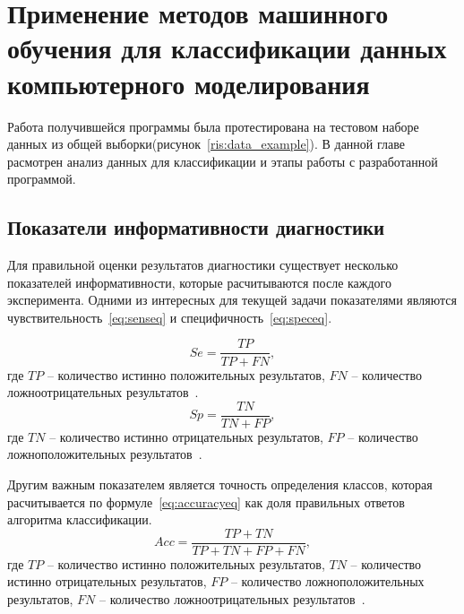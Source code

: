 \newpage
\section{\Large Применение методов машинного обучения для классификации данных компьютерного моделирования}
Работа получившейся программы была протестирована на тестовом наборе данных из общей выборки(рисунок~\ref{ris:data_example}). В данной главе расмотрен анализ данных для классификации и этапы работы с разработанной программой.

\subsection{Показатели информативности диагностики}
Для правильной оценки результатов диагностики существует несколько показателей информативности, которые расчитываются после каждого эксперимента. Одними из интересных для текущей задачи показателями являются чувствительность~\eqref{eq:senseq} и специфичность~\eqref{eq:speceq}.
\par
\begin{equation}\label{eq:senseq}
Se = \frac{TP}{TP + FN},
\end{equation}
где $TP$ -- количество истинно положительных результатов, $FN$ -- количество ложноотрицательных результатов~\cite{pokazaetli}.
\begin{equation}\label{eq:speceq}
Sp = \frac{TN}{TN + FP},
\end{equation}
где $TN$ -- количество истинно отрицательных результатов, $FP$ -- количество ложноположительных результатов~\cite{pokazaetli}.
\par
Другим важным показателем является точность определения классов, которая расчитывается по формуле~\eqref{eq:accuracyeq} как доля правильных ответов алгоритма классификации.
\begin{equation}\label{eq:accuracyeq}
Acc = \frac{TP + TN}{TP + TN + FP + FN},
\end{equation}
где $TP$ -- количество истинно положительных результатов, $TN$ -- количество истинно отрицательных результатов, $FP$ -- количество ложноположительных результатов, $FN$ -- количество ложноотрицательных результатов~\cite{pokazaetli}.

